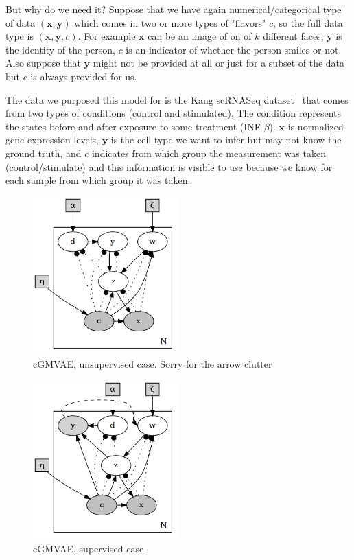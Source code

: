 \documentclass[11pt, a4paper]{report}
\theoremstyle{plain}
\theoremstyle{definition}
\theoremstyle{remark}
\newcommand{\x}{\mathbf{x}}
\newcommand{\y}{\mathbf{y}}
\begin{document}
But why do we need it?
Suppose that we have again numerical/categorical type of data $(\x, \y)$ which 
comes in two or more types of "flavors" $c$, so the full data type 
is $(\x, \y, c)$. For example $\x$ can be an image of on of $k$ 
different faces, 
$\y$ is the identity of the person, $c$ is an indicator of whether the person
smiles or not. 
Also suppose that $\y$ might not be provided at all or just for
a subset of the data but $c$ is always provided for us.

The data we purposed this model for is the Kang scRNASeq
dataset~\cite{kang2018multiplexed} that comes from two types 
of conditions (control and stimulated), 
The condition represents the states before and after exposure to some treatment
(INF-$\beta$).
$\x$ is normalized gene expression levels, $\y$ is the cell type 
we want to infer but may not know the ground truth, and $c$ indicates from which
group the measurement was taken (control/stimulate) and this information is
visible to use because we know for each sample from which group it was
taken.


\begin{figure}[h]
\centering
\includegraphics[width=0.5\textwidth]{plots/dirichlet_gmm_cvae.v2.gv.png}
\caption{cGMVAE, unsupervised case. Sorry for the arrow clutter}
\label{fig:dirgmmcvae}
\end{figure}

\begin{figure}[h]
\centering
\includegraphics[width=0.5\textwidth]{plots/dirichlet_gmm_cvae_supervised.v2.gv.png}
\caption{cGMVAE, supervised case}
\label{fig:dirgmmcvae_super}
\end{figure}
\end{document}
